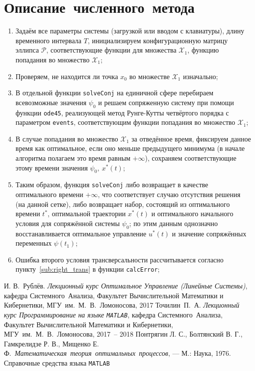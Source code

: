 \documentclass[11pt, oneside, final]{article}
\theoremstyle{break}
\numberwithin{equation}{section}
\theoremstyle{plain}
\theoremstyle{definition}
\begin{document}
    \section{Описание~численного~метода} %
    \label{sec:method}
    \begin{enumerate}
        \item Задаём все параметры системы (загрузкой или вводом с клавиатуры), длину временного интервала \(T\), инициализируем конфигурационную матрицу эллипса \(\mathcal{P}\), соответствующие функции для множества \(\mathcal{X}_1\), функцию попадания во множество \(\mathcal{X}_1\);
        \item Проверяем, не находится ли точка \(x_0\) во множестве \(\mathcal{X}_1\) изначально;
        \item В отдельной функции \texttt{solveConj} на единичной сфере перебираем всевозможные значения \(\psi_0\) и решаем сопряженную систему при помощи функции \texttt{ode45}, реализующей метод Рунге-Кутты четвёртого порядка с параметром \texttt{events}, соответствующим функции попадания во множество \(\mathcal{X}_1\);
        \item В случае попадания во множество \(\mathcal{X}_1\) за отведённое время, фиксируем данное время как оптимальное, если оно меньше предыдущего минимума (в начале алгоритма полагаем это время равным \(+\infty\)), сохраняем соответствующие этому времени значения \(\psi_0,\:x^*(t)\);
        \item Таким образом, функция \texttt{solveConj} либо возвращает в качестве оптимального времени \(+\infty\), что соответствует случаю отсутствия решения (на данной сетке), либо возвращает набор, состоящий из оптимального времени \(t^*\), оптимальной траектории \(x^*(t)\) и оптимального начального условия для сопряжённой системы \(\psi_0\); по этим данным однозначно восстанавливается оптимальное управление \(u^*(t)\) и значение сопряжённых переменных \(\psi(t_1)\);
        \item Ошибка второго условия трансверсальности рассчитывается согласно пункту~\ref{sub:right_trans} в функции \texttt{calcError};
        
    \end{enumerate}
    
    \begin{thebibliography}{0}
         И. В.~Рублёв. \emph{Лекционный курс Оптимальное Управление (Линейные Системы)},
        кафедра Системного~Анализа, Факультет Вычислительной Математики и Кибернетики, МГУ~им.~М.~В.~Ломоносова, 
        2017
         Точилин~П.~А. \emph{Лекционный курс Программирование на языке \texttt{MATLAB}},
        кафедра Системного~Анализа, Факультет Вычислительной Математики и Кибернетики, МГУ~им.~М.~В.~Ломоносова, 
        2017~-- 2018
         Понтрягин Л. С., Болтянский В. Г., Гамкрелидзе Р. В., Мищенко Е. Ф.~\emph{Математическая~теория~оптимальных~процессов}, — М.: Наука, 1976.
         Справочные средства языка \texttt{MATLAB}
    \end{thebibliography}
\end{document}
